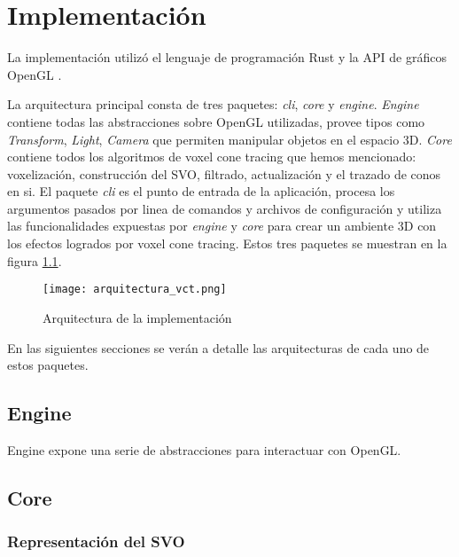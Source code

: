 \graphicspath{{chapters/4_implementación/figures/}}

\chapter{Implementación}\label{chap:implementation}

La implementación utilizó el lenguaje de programación Rust \cite{rust-lang} y la API de gráficos OpenGL \cite{opengl-spec}.

La arquitectura principal consta de tres paquetes: \textit{cli}, \textit{core} y \textit{engine}.
\textit{Engine} contiene todas las abstracciones sobre OpenGL utilizadas, provee tipos como \textit{Transform}, \textit{Light}, \textit{Camera} que permiten manipular objetos en el espacio 3D.
\textit{Core} contiene todos los algoritmos de voxel cone tracing que hemos mencionado: voxelización, construcción del SVO, filtrado, actualización y el trazado de conos en si.
El paquete \textit{cli} es el punto de entrada de la aplicación, procesa los argumentos pasados por linea de comandos y archivos de configuración y utiliza las funcionalidades expuestas por \textit{engine} y \textit{core} para crear un ambiente 3D con los efectos logrados por voxel cone tracing.
Estos tres paquetes se muestran en la figura \ref{fig:overall_architecture}.

\begin{figure}
    \centering
    \texttt{[image: arquitectura\_vct.png]}
    \caption{Arquitectura de la implementación}
    \label{fig:overall_architecture}
\end{figure}

En las siguientes secciones se verán a detalle las arquitecturas de cada uno de estos paquetes.

\section{Engine}

Engine expone una serie de abstracciones para interactuar con OpenGL.


\section{Core}


\subsection{Representación del SVO}\label{implementation:svo_representation}


